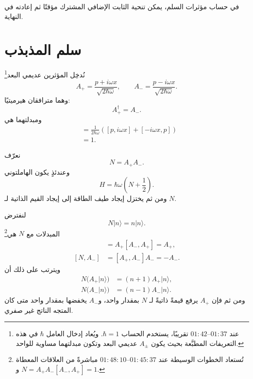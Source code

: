في حساب مؤثرات السلم، يمكن تنحية الثابت الإضافي المشترك مؤقتًا ثم إعادته في النهاية.

\begin{classroomqa}
\end{classroomqa}

\section{سلم المذبذب}

نُدخِل المؤثرين عديمي البعد\footnote{عند \(01{:}37\)--\(01{:}42\) تقريبًا، يستخدم الحساب \(\hbar=1\). ويُعاد إدخال العامل \(\hbar\) في هذه التعريفات المطبَّعة بحيث يكون \(A_\pm\) عديمي البعد وتكون مبدلتهما مساوية للواحد.}
\begin{equation}
A_+=\frac{p+i\omega x}{\sqrt{2\hbar\omega}},
\qquad
A_-=\frac{p-i\omega x}{\sqrt{2\hbar\omega}}.
\end{equation}
وهما مترافقان هيرميتيًا:
\begin{equation}
A_+^\dagger=A_-.
\end{equation}
ومبدلتهما هي
\begin{align}
[A_-,A_+]
&=\frac{1}{2\hbar\omega}
\left([p,i\omega x]+[-i\omega x,p]\right) \\
&=1.
\end{align}

نعرّف
\begin{equation}
N=A_+A_-.
\end{equation}
وعندئذٍ يكون الهاملتوني
\begin{equation}
H=\hbar\omega\left(N+\frac{1}{2}\right).
\end{equation}
ومن ثم يختزل إيجاد طيف الطاقة إلى إيجاد القيم الذاتية لـ \(N\).

لنفترض
\begin{equation}
N|n\rangle=n|n\rangle.
\end{equation}
المبدلات مع \(N\) هي\footnote{تُستعاد الخطوات الوسيطة عند \(01{:}45{:}37\)--\(01{:}48{:}10\) مباشرةً من العلاقات المعطاة \(N=A_+A_-\) و\([A_-,A_+]=1\).}
\begin{align}
[N,A_+]
&=A_+[A_-,A_+]=A_+, \\
[N,A_-]
&=[A_+,A_-]A_-=-A_-.
\end{align}
ويترتب على ذلك أن
\begin{align}
N\bigl(A_+|n\rangle\bigr)
&=(n+1)A_+|n\rangle, \\
N\bigl(A_-|n\rangle\bigr)
&=(n-1)A_-|n\rangle.
\end{align}
ومن ثم فإن \(A_+\) يرفع قيمةً ذاتيةً لـ \(N\) بمقدار واحد، و\(A_-\) يخفضها بمقدار واحد متى كان المتجه الناتج غير صفري.

